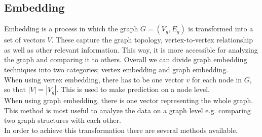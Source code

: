 \documentclass[sigconf]{acmart}
\begin{document}
\subsection{Embedding}
Embedding is a process in which the graph \(G = (V_g, E_g)\) is transformed into a set of vectors \(V\).
These capture the graph topology, vertex-to-vertex relationship as well as other relevant information.
This way, it is more accessible for analyzing the graph and comparing it to others.
Overall we can divide graph embedding techniques into two categories; 
vertex embedding and graph embedding. \\
When using vertex embedding, there has to be one vector \(v\) for each node in \(G\), so that \(|V| = |V_g|\). This is used to make prediction 
on a node level.\\
When using graph embedding, there is one vector representing the whole graph. This method is most useful to analyze the data on a graph level e.g.
comparing two graph structures with each other.\\
In order to achieve this transformation there are several methods available.
\end{document}
